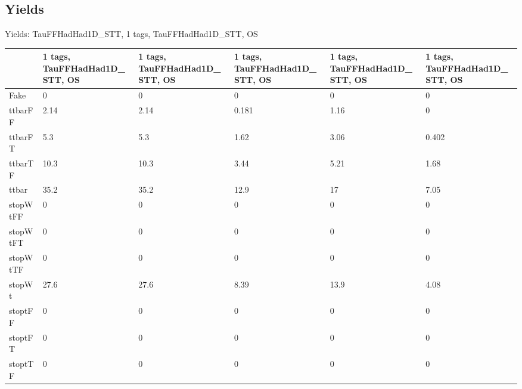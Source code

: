 
\subsection{Yields}

\begin{frame}{Yields: TauFFHadHad1D\_STT, 1 tags, TauFFHadHad1D\_STT, OS}
\begin{center}
  \begin{tabular}{l| >{\centering\let\newline\\\arraybackslash\hspace{0pt}}m{1.4cm}| >{\centering\let\newline\\\arraybackslash\hspace{0pt}}m{1.4cm}| >{\centering\let\newline\\\arraybackslash\hspace{0pt}}m{1.4cm}| >{\centering\let\newline\\\arraybackslash\hspace{0pt}}m{1.4cm}| >{\centering\let\newline\\\arraybackslash\hspace{0pt}}m{1.4cm}}
    & 1 tags, TauFFHadHad1D\_STT, OS & 1 tags, TauFFHadHad1D\_STT, OS & 1 tags, TauFFHadHad1D\_STT, OS & 1 tags, TauFFHadHad1D\_STT, OS & 1 tags, TauFFHadHad1D\_STT, OS \\
 \hline \hline
    Fake& 0 & 0 & 0 & 0 & 0 \\
 \hline
    ttbarFF& 2.14 & 2.14 & 0.181 & 1.16 & 0 \\
 \hline
    ttbarFT& 5.3 & 5.3 & 1.62 & 3.06 & 0.402 \\
 \hline
    ttbarTF& 10.3 & 10.3 & 3.44 & 5.21 & 1.68 \\
 \hline
    ttbar& 35.2 & 35.2 & 12.9 & 17 & 7.05 \\
 \hline
    stopWtFF& 0 & 0 & 0 & 0 & 0 \\
 \hline
    stopWtFT& 0 & 0 & 0 & 0 & 0 \\
 \hline
    stopWtTF& 0 & 0 & 0 & 0 & 0 \\
 \hline
    stopWt& 27.6 & 27.6 & 8.39 & 13.9 & 4.08 \\
 \hline
    stoptFF& 0 & 0 & 0 & 0 & 0 \\
 \hline
    stoptFT& 0 & 0 & 0 & 0 & 0 \\
 \hline
    stoptTF& 0 & 0 & 0 & 0 & 0 \\

\end{tabular}
\end{center}
\end{frame}
